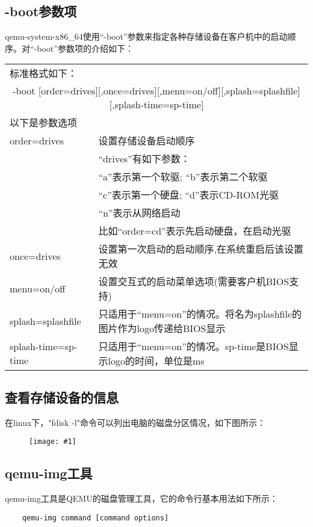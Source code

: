 \documentclass[a4paper,left=2.5cm,right=2.5cm,11pt]{article}
\newcommand{\fic}[1]{\begin{figure}[H]
		\center
		\texttt{[image: \#1]}
	\end{figure}}
\newcommand{\interval}{\vspace{0.5em}}
\begin{document}
\subsection{-boot参数项}
	qemu-system-x86\_64使用“-boot”参数来指定各种存储设备在客户机中的启动顺序。对“-boot”参数项的介绍如下：
	\interval
	\begin{longtable}{p{3cm}p{10cm}}
	\hline
	标准格式如下：& \\
	\multicolumn{2}{c}{-boot [order=drives][,once=drives][,menu=on/off][,splash=splashfile][,splash-time=sp-time]} \\
	\hline
	以下是参数选项 & \\
	\hline
	order=drives & 设置存储设备启动顺序 \\
			     & “drives”有如下参数：\\
			     & “a”表示第一个软驱; “b”表示第二个软驱 \\
				& “c”表示第一个硬盘; “d”表示CD-ROM光驱 \\
				& “n”表示从网络启动 \\
				& 比如“order=cd”表示先启动硬盘，在启动光驱 \\ 
	\hline
	once=drives & 设置第一次启动的启动顺序,在系统重启后该设置无效 \\
	\hline
	menu=on/off & 设置交互式的启动菜单选项(需要客户机BIOS支持) \\
	\hline
	splash=splashfile & 只适用于“menu=on”的情况。将名为splashfile的图片作为logo传递给BIOS显示 \\
	\hline
	splash-time=sp-time & 只适用于“menu=on”的情况。sp-time是BIOS显示logo的时间，单位是ms \\
	\hline
	\end{longtable}

\subsection{查看存储设备的信息}
	在linux下，"fdisk -l"命令可以列出电脑的磁盘分区情况，如下图所示：
	\fic{10.png}

\subsection{qemu-img工具}
	qemu-img工具是QEMU的磁盘管理工具，它的命令行基本用法如下所示：
	\begin{lstlisting}
	qemu-img command [command options]
	\end{lstlisting}
\end{document}
